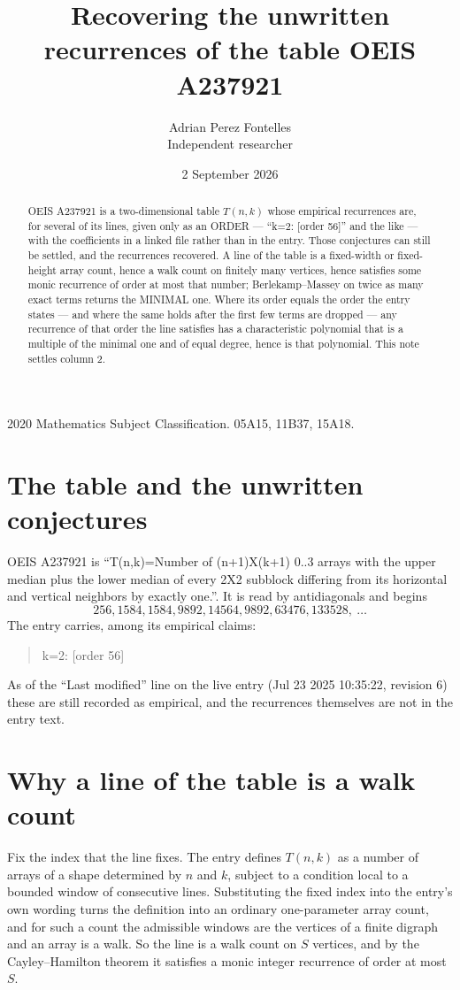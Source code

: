 \documentclass[11pt,a4paper]{article}
\title{Recovering the unwritten recurrences of the table OEIS A237921}
\author{Adrian Perez Fontelles\\ \small Independent researcher}
\date{2 September 2026}
\theoremstyle{plain}
\theoremstyle{definition}
\begin{document}
\maketitle

\begin{abstract}
OEIS A237921 is a two-dimensional table $T(n,k)$ whose empirical recurrences are, for several of
its lines, given only as an ORDER --- ``k=2: [order 56]'' and the like --- with the
coefficients in a linked file rather than in the entry. Those conjectures can still be settled,
and the recurrences recovered. A line of the table is a fixed-width or fixed-height array
count, hence a walk count on finitely many vertices, hence satisfies some monic recurrence of
order at most that number; Berlekamp--Massey on twice as many exact terms returns the MINIMAL
one. Where its order equals the order the entry states --- and where the same holds after the
first few terms are dropped --- any recurrence of that order the line satisfies has a
characteristic polynomial that is a multiple of the minimal one and of equal degree, hence is
that polynomial. This note settles column 2.
\end{abstract}

\noindent\small 2020 Mathematics Subject Classification. 05A15, 11B37, 15A18.\normalsize

\section{The table and the unwritten conjectures}

OEIS A237921 is ``T(n,k)=Number of (n+1)X(k+1) 0..3 arrays with the upper median plus the lower median of every 2X2 subblock differing from its horizontal and vertical neighbors by exactly one.''. It is read by antidiagonals and begins
\[
256, 1584, 1584, 9892, 14564, 9892, 63476, 133528,\ \dots
\]
The entry carries, among its empirical claims:
\begin{quote}\small
k=2: [order 56]
\end{quote}
As of the ``Last modified'' line on the live entry (Jul 23 2025 10:35:22, revision 6) these are still
recorded as empirical, and the recurrences themselves are not in the entry text.

\section{Why a line of the table is a walk count}

Fix the index that the line fixes. The entry defines $T(n,k)$ as a number of arrays of a shape
determined by $n$ and $k$, subject to a condition local to a bounded window of consecutive
lines. Substituting the fixed index into the entry's own wording turns the definition into an
ordinary one-parameter array count, and for such a count the admissible windows are the
vertices of a finite digraph and an array is a walk. So the line is a walk count on $S$
vertices, and by the Cayley--Hamilton theorem it satisfies a monic integer recurrence of order
at most $S$.
\end{document}
